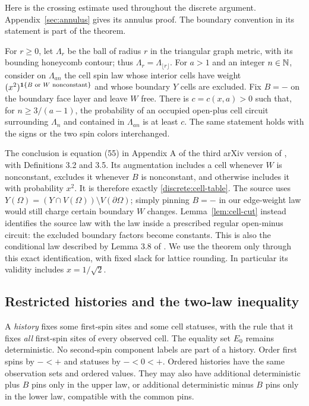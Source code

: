 \begin{samepage}
Here is the crossing estimate used throughout the discrete argument.
Appendix~\ref{sec:annulus} gives its annulus proof.
The boundary convention in its statement is part of the theorem.

\begin{theorem}\label{thm:circuit-input}
For $r\ge0$, let $\Lambda_r$ be the ball of radius $r$ in the triangular
graph metric, with its bounding honeycomb contour; thus
$\Lambda_r=\Lambda_{\lfloor r\rfloor}$. For $a>1$ and an integer
$n\in\mathbb N$, consider on
$\Lambda_{an}$ the cell spin law whose
interior cells have weight $(x^2)^{\mathbf 1\{B\text{ or }W\text{ nonconstant}\}}$
and whose boundary $Y$ cells are excluded. Fix $B=-$ on the boundary face
layer and leave $W$ free. There is $c=c(x,a)>0$ such
that, for $n\ge 3/(a-1)$, the probability of an occupied open-plus cell
circuit surrounding $\Lambda_n$ and contained in $\Lambda_{an}$ is at
least $c$. The same statement holds with the signs or the two spin colors
interchanged.
\end{theorem}
\end{samepage}

The conclusion is equation (55) in Appendix A of the third arXiv version
of \cite{GL2025}, with Definitions 3.2 and 3.5.  Its augmentation includes a
cell whenever $W$ is nonconstant, excludes it whenever $B$ is nonconstant,
and otherwise includes it with probability $x^2$. It is therefore exactly
\eqref{discrete:cell-table}. The source uses
$Y(\Omega)=(Y\cap V(\Omega))\setminus V(\partial\Omega)$; simply pinning
$B=-$ in our edge-weight law would still charge certain boundary $W$
changes. Lemma~\ref{lem:cell-cut} instead identifies the source law with
the law inside a prescribed regular open-minus circuit: the excluded
boundary factors become constants. This is also the conditional law
described by Lemma 3.8 of \cite{GL2025}. We use the theorem only through
this exact identification, with fixed slack for lattice rounding. In
particular its validity includes $x=1/\sqrt2$.

\subsection{Restricted histories and the two-law inequality}

A \emph{history} fixes some first-spin sites and some cell statuses, with
the rule that it fixes \emph{all} first-spin sites of every observed cell.
The equality set $E_0$ remains deterministic. No second-spin component
labels are part of a history. Order first spins by $-<+$ and statuses by
$-<0<+$. Ordered histories have the same observation sets and ordered
values. They may also have additional deterministic plus $B$ pins only in
the upper law, or additional deterministic minus $B$ pins only in the
lower law, compatible with the common pins.


